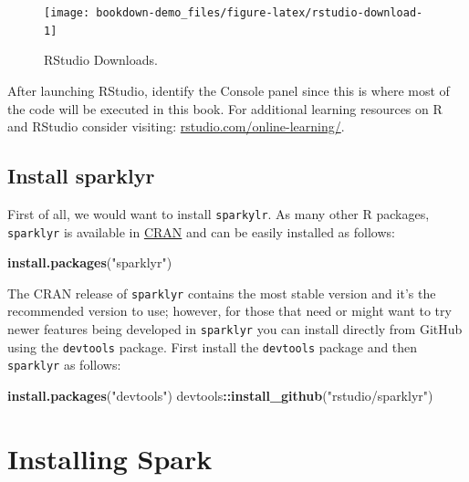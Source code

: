 \documentclass[]{book}
\newenvironment{Shaded}{\begin{snugshade}}{\end{snugshade}}
\newcommand{\KeywordTok}[1]{\textcolor[rgb]{0.13,0.29,0.53}{\textbf{#1}}}
\newcommand{\StringTok}[1]{\textcolor[rgb]{0.31,0.60,0.02}{#1}}
\newcommand{\OperatorTok}[1]{\textcolor[rgb]{0.81,0.36,0.00}{\textbf{#1}}}
\newcommand{\NormalTok}[1]{#1}
\theoremstyle{definition}
\theoremstyle{definition}
\theoremstyle{definition}
\theoremstyle{remark}
\begin{document}
\begin{figure}

{\centering \texttt{[image: bookdown-demo\_files/figure-latex/rstudio-download-1]} 

}

\caption{RStudio Downloads.}\label{fig:rstudio-download}
\end{figure}

After launching RStudio, identify the Console panel since this is where
most of the code will be executed in this book. For additional learning
resources on R and RStudio consider visiting:
\href{https://www.rstudio.com/online-learning/}{rstudio.com/online-learning/}.

\subsection{Install sparklyr}\label{install-sparklyr}

First of all, we would want to install \texttt{sparkylr}. As many other
R packages, \texttt{sparklyr} is available in
\href{https://CRAN.R-project.org/package=sparklyr}{CRAN} and can be
easily installed as follows:

\begin{Shaded}
\begin{Highlighting}[]
\KeywordTok{install.packages}\NormalTok{(}\StringTok{"sparklyr"}\NormalTok{)}
\end{Highlighting}
\end{Shaded}

The CRAN release of \texttt{sparklyr} contains the most stable version
and it's the recommended version to use; however, for those that need or
might want to try newer features being developed in \texttt{sparklyr}
you can install directly from GitHub using the \texttt{devtools}
package. First install the \texttt{devtools} package and then
\texttt{sparklyr} as follows:

\begin{Shaded}
\begin{Highlighting}[]
\KeywordTok{install.packages}\NormalTok{(}\StringTok{"devtools"}\NormalTok{)}
\NormalTok{devtools}\OperatorTok{::}\KeywordTok{install_github}\NormalTok{(}\StringTok{"rstudio/sparklyr"}\NormalTok{)}
\end{Highlighting}
\end{Shaded}

\section{Installing Spark}\label{installing-spark}
\end{document}
